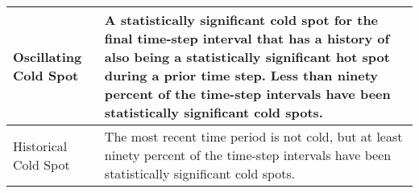 \begin{longtable}{|l|p{10cm}|}
Oscillating Cold Spot & A statistically significant cold spot for the final time-step interval that has a history of also being a statistically significant hot spot during a prior time step. Less than ninety percent of the time-step intervals have been statistically significant cold spots. \\ \hline
Historical Cold Spot & The most recent time period is not cold, but at least ninety percent of the time-step intervals have been statistically significant cold spots. \\ \hline

\end{longtable}
